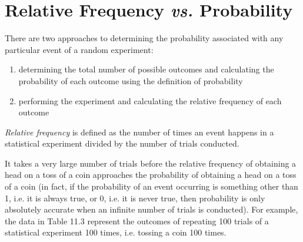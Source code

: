             \section{ Relative Frequency \textsl{vs.}
Probability}
            \nopagebreak
      \label{m39373*id112458}There are two approaches to determining the
probability associated with any particular event of a random experiment:\par 
      \label{m39373*id112462}\begin{enumerate}[noitemsep, label=\textbf{\arabic*}. ] 
            \label{m39373*uid54}\item determining the total number of possible outcomes and
calculating the probability of each outcome using the definition of probability
\label{m39373*uid55}\item performing the experiment and calculating the relative
frequency of each outcome
\end{enumerate}
      \label{m39373*id112492}\textsl{Relative
frequency} is defined as the number of times an event happens in a
statistical experiment divided by the number of trials conducted.\par 
      \label{m39373*id112501}It takes a very large number of trials before the
relative frequency of obtaining a head on a toss of a coin approaches the
probability of obtaining a head on a toss of a coin (in fact, if the probability of an event occurring is something other than 1, i.e. it is always true, or 0, i.e. it is never true, then probability is only absolutely accurate when an infinite number of trials is conducted). For example, the data in
Table 11.3 represent the outcomes of repeating 100 trials of a
statistical experiment 100 times, i.e. tossing a coin 100 times.\par 
